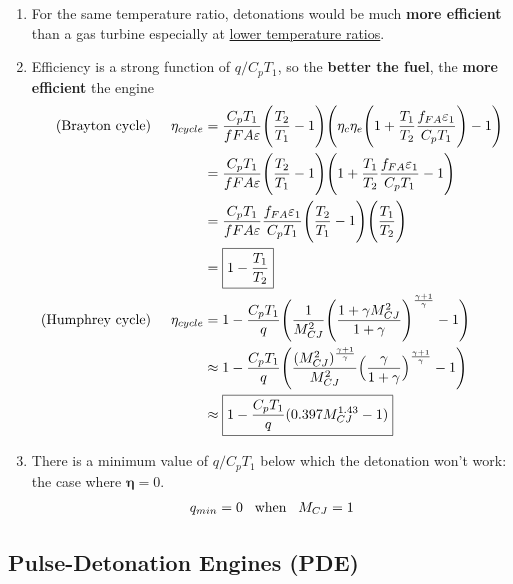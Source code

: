 \documentclass[a4paper,10pt]{article}
\begin{document}
\begin{enumerate}
    \item For the same temperature ratio, detonations would be much \textbf{more efficient} than a gas turbine especially at \underline{lower temperature ratios}.
    \item Efficiency is a strong function of $q/C_pT_1$, so the \textbf{better the fuel}, the \textbf{more efficient} the engine
        \begin{gather*}
            \begin{split}
            \text{(Brayton cycle)}\hspace*{0.5cm}\eta_{cycle} &= \frac{C_pT_1}{f{FA}\varepsilon}\Bigg(\frac{T_2}{T_1}-1\Bigg)\Bigg(\eta_c\eta_e\Bigg(1+\frac{T_1}{T_2}\frac{f_{FA}\varepsilon_1}{C_pT_1}\Bigg)-1\Bigg)\\
            &= \frac{C_pT_1}{f{FA}\varepsilon}\Bigg(\frac{T_2}{T_1}-1\Bigg)\Bigg(1+\frac{T_1}{T_2}\frac{f_{FA}\varepsilon_1}{C_pT_1}-1\Bigg)\\
            &= \frac{C_pT_1}{f{FA}\varepsilon}\frac{f_{FA}\varepsilon_1}{C_pT_1}\Bigg(\frac{T_2}{T_1}-1\Bigg)\Bigg(\frac{T_1}{T_2}\Bigg)\\
            & = \boxed{1-\frac{T_1}{T_2}}\\
            \text{(Humphrey cycle)}\hspace*{0.5cm}\eta_{cycle} &= 1-\frac{C_pT_1}{q}\Bigg(\frac{1}{M_{CJ}^2}\Bigg(\frac{1+\gamma M_{CJ}^2}{1+\gamma}\Bigg)^{\frac{\gamma+1}{\gamma}}-1\Bigg)\\
            &\approx1-\frac{C_pT_1}{q}\Bigg(\frac{(M_{CJ}^2)^{\frac{\gamma+1}{\gamma}}}{M_{CJ}^2}\Big(\frac{\gamma}{1+\gamma}\Big)^{\frac{\gamma+1}{\gamma}}-1\Bigg)\\
            &\approx\boxed{1-\frac{C_pT_1}{q}(0.397M_{CJ}^{1.43}-1)}
            \end{split}
        \end{gather*}
    \item There is a minimum value of $q/C_pT_1$ below which the detonation won't work: the case where $\pmb{\eta} = 0$.
        \begin{gather*}
            q_{min} = 0\hspace*{0.3cm}\text{when}\hspace*{0.3cm}M_{CJ} = 1
        \end{gather*}
\end{enumerate}

\newpage
\subsection{Pulse-Detonation Engines (PDE)}
\end{document}
